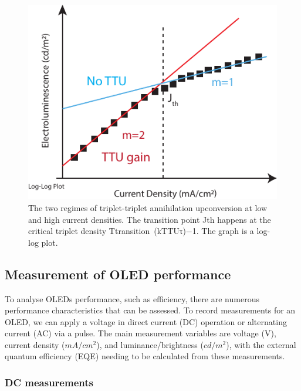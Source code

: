 \documentclass[
  letterpaper,
  DIV=11,
  numbers=noendperiod,
  oneside]{scrreprt}
\begin{document}
\begin{figure}

{\centering \includegraphics{./images/LoglogTTU.pdf}

}

\caption{\label{fig-loglogTTU}The two regimes of triplet-triplet
annihilation upconversion at low and high current densities. The
transition point {Jth} happens at the critical triplet density
{Ttransition~(kTTUτ)−1}. The graph is a log-log plot.}

\end{figure}

\hypertarget{measurement-of-oled-performance}{%
\subsection{Measurement of OLED
performance}\label{measurement-of-oled-performance}}

To analyse OLEDs performance, such as efficiency, there are numerous
performance characteristics that can be assessed. To record measurements
for an OLED, we can apply a voltage in direct current (DC) operation or
alternating current (AC) via a pulse. The main measurement variables are
voltage (V), current density (\(mA/cm^2\)), and luminance/brightness
(\(cd/m^2\)), with the external quantum efficiency (EQE) needing to be
calculated from these measurements.

\hypertarget{dc-measurements}{%
\subsubsection{DC measurements}\label{dc-measurements}}
\end{document}
